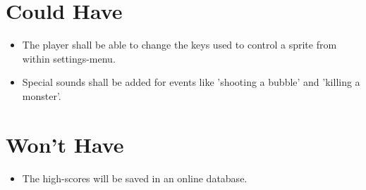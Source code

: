 \section{Could Have}
\begin{itemize}
\itemsep0em
\item The player shall be able to change the keys used to control a sprite from within settings-menu. 
\item Special sounds shall be added for events like 'shooting a bubble' and 'killing a monster'. 
\end{itemize}

\section{Won't Have}
\begin{itemize}
\itemsep0em
\item The high-scores will be saved in an online database. 
\end{itemize}